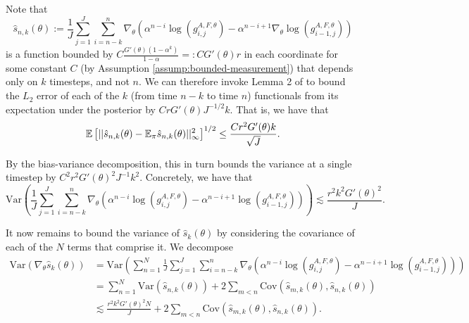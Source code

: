 \documentclass{article}
\begin{document}
Note that $$\hat s_{n,k}(\theta) := \frac{1}{J}\sum_{j=1}^J\sum_{i=n-k}^n \nabla_\theta\left(\alpha^{n-i} \log\left(g_{i,j}^{A,F,\theta}\right)- \alpha^{n-i+1} \nabla_\theta \log\left(g_{i-1,j}^{A,F,\theta}\right)\right)$$ is a function bounded by $C\frac{G'(\theta)(1-\alpha^k)}{1-\alpha} =: CG'(\theta)r$ in each coordinate for some constant $C$ (by Assumption \ref{assump:bounded-measurement}) that depends only on $k$ timesteps, and not $n$. We can therefore invoke Lemma 2 of \cite{karjalainen2023} to bound the $L_2$ error of each of the $k$ (from time $n-k$ to time $n$) functionals from its expectation under the posterior by $CrG'(\theta)J^{-1/2}k$. That is, we have that
$$\mathbb{E}\left[||\hat s_{n,k}(\theta) - \mathbb{E}_{\pi}\hat s_{n,k}(\theta)||_\infty^2\right]^{1/2} \leq \frac{Cr^2G'(\theta) k}{\sqrt{J}}.$$


By the bias-variance decomposition, this in turn bounds the variance at a single timestep by $C^2r^2G'(\theta)^2J^{-1}k^2$. Concretely, we have that
$$\text{Var}\left(\frac{1}{J}\sum_{j=1}^J\sum_{i=n-k}^n \nabla_\theta\left(\alpha^{n-i} \log\left(g_{i,j}^{A,F,\theta}\right)- \alpha^{n-i+1} \log\left(g_{i-1,j}^{A,F,\theta}\right)\right)\right) \lesssim \frac{r^2k^2G'(\theta)^2}{J}.$$

It now remains to bound the variance of $\hat s_k(\theta)$ by considering the covariance of each of the $N$ terms that comprise it. We decompose
\begin{align*}
    \text{Var}(\nabla_\theta \hat s_k(\theta)) &= \text{Var}\left(\sum_{n=1}^N \frac{1}{J}\sum_{j=1}^J\sum_{i=n-k}^n \nabla_\theta\left(\alpha^{n-i} \log\left(g_{i,j}^{A,F,\theta}\right)- \alpha^{n-i+1} \log\left(g_{i-1,j}^{A,F,\theta}\right)\right)\right) \\
    &= \sum_{n=1}^N\text{Var}\left(\hat s_{n,k}(\theta)\right)+ 2\sum_{m<n}\text{Cov}\left(\hat s_{m,k}(\theta), \hat s_{n,k}(\theta)\right) \\
    &\lesssim \frac{r^2k^2G'(\theta)^2N}{J} + 2\sum_{m<n}\text{Cov}\left(\hat s_{m,k}(\theta), \hat s_{n,k}(\theta)\right).
\end{align*}
\end{document}
